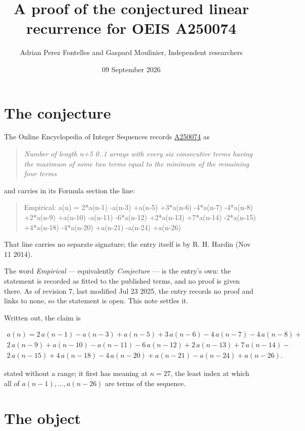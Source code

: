 \documentclass[11pt]{article}
\title{A proof of the conjectured linear recurrence for OEIS A250074}
\author{Adrian Perez Fontelles and Gaspard Moulinier, Independent researchers}
\date{09 September 2026}
\theoremstyle{definition}
\begin{document}
\maketitle
\section{The conjecture}

The Online Encyclopedia of Integer Sequences records \href{https://oeis.org/A250074}{A250074} as

\begin{quote}\itshape Number of length n+5 0..1 arrays with every six consecutive terms having the maximum of some two terms equal to the minimum of the remaining four terms\end{quote}

and carries in its Formula section the line:

\begin{quote}\ttfamily Empirical: a(n) = 2*a(n-1) -a(n-3) +a(n-5) +3*a(n-6) -4*a(n-7) -4*a(n-8) +2*a(n-9) +a(n-10) -a(n-11) -6*a(n-12) +2*a(n-13) +7*a(n-14) -2*a(n-15) +4*a(n-18) -4*a(n-20) +a(n-21) -a(n-24) +a(n-26)\end{quote}

That line carries no separate signature; the entry itself is by R. H. Hardin (Nov 11 2014).

The word {\itshape Empirical} --- equivalently {\itshape Conjecture} --- is the entry's own: the statement is recorded as fitted to the published terms, and no proof is given there. As of revision 7, last modified Jul 23 2025, the entry records no proof and links to none, so the statement is open. This note settles it.

Written out, the claim is

\begin{multline*} a(n) = 2\,a(n-1) - a(n-3) + a(n-5) + 3\,a(n-6) - 4\,a(n-7) - 4\,a(n-8) + \\ 2\,a(n-9) + a(n-10) - a(n-11) - 6\,a(n-12) + 2\,a(n-13) + 7\,a(n-14) - \\ 2\,a(n-15) + 4\,a(n-18) - 4\,a(n-20) + a(n-21) - a(n-24) + a(n-26). \end{multline*}

stated without a range; it first has meaning at $n = 27$, the least index at which all of $a(n-1),\dots,a(n-26)$ are terms of the sequence.

\section{The object}
\end{document}
